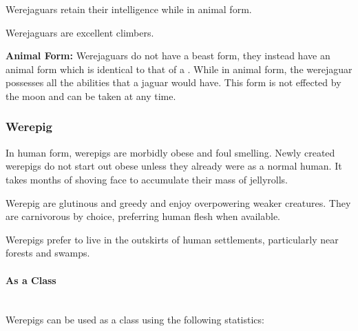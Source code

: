 \begin{multicols*}{2}
Werejaguars retain their intelligence while in animal form.

Werejaguars are excellent climbers.

\textbf{Animal Form:} Werejaguars do not have a beast form, they instead have an animal form which is identical to that of a . While in animal form, the werejaguar possesses all the abilities that a jaguar would have. This form is not effected by the moon and can be taken at any time.

\subsubsection{Werepig}

In human form, werepigs are morbidly obese and foul smelling.  Newly created werepigs do not start out obese unless they already were as a normal human. It takes months of shoving face to accumulate their mass of jellyrolls.

Werepig are glutinous and greedy and enjoy overpowering weaker creatures. They are carnivorous by choice, preferring human flesh when available.

Werepigs prefer to live in the outskirts of human settlements, particularly near forests and swamps.

\paragraph{As a Class}\mbox{}\\
Werepigs can be used as a class using the following statistics:


\end{multicols*}
